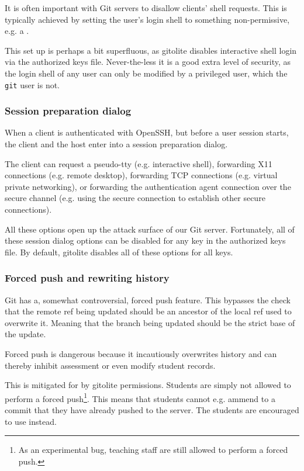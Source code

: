 It is often important with Git servers to disallow clients' shell requests.
This is typically achieved by setting the user's login shell to something
non-permissive, e.g. a \cite{man-1-git-shell}.

This set up is perhaps a bit superfluous, as gitolite disables interactive
shell login via the authorized keys file. Never-the-less it is a good extra
level of security, as the login shell of any user can only be modified by a
privileged user, which the \texttt{git} user is not.

\subsubsection{Session preparation dialog}

When a client is authenticated with OpenSSH, but before a user session starts,
the client and the host enter into a session preparation dialog.

The client can request a pseudo-tty (e.g. interactive shell), forwarding X11
connections (e.g. remote desktop), forwarding TCP connections (e.g. virtual
private networking), or forwarding the authentication agent connection over the
secure channel (e.g. using the secure connection to establish other secure
connections).

All these options open up the attack surface of our Git server. Fortunately,
all of these session dialog options can be disabled for any key in the
authorized keys file\cite{man-8-sshd}. By default, gitolite disables all of
these options for all keys.

\subsubsection{Forced push and rewriting history}

Git has a, somewhat controversial\cite{torvalds-2007,hamano-2009,rego-2013},
forced push feature. This bypasses the check that the remote ref being updated
should be an ancestor of the local ref used to overwrite
it\cite{man-1-git-push}. Meaning that the branch being updated should be the
strict base of the update.

Forced push is dangerous because it incautiously overwrites history and can
thereby inhibit assessment or even modify student records.

This is mitigated for by gitolite permissions. Students are simply not allowed
to perform a forced push\footnote{As an experimental bug, teaching staff are
still allowed to perform a forced push.}. This means that students cannot e.g.
ammend to a commit that they have already pushed to the server. The students
are encouraged to use \cite{man-1-git-revert} instead.

